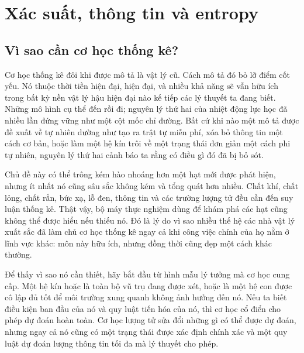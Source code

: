 \chapter{Xác suất, thông tin và entropy}


\section{Vì sao cần cơ học thống kê?}

Cơ học thống kê đôi khi được mô tả là vật lý cũ. Cách mô tả đó bỏ lỡ điểm cốt yếu. Nó thuộc thời tiền hiện đại, hiện đại, và nhiều khả năng sẽ vẫn hữu ích trong bất kỳ nền vật lý hậu hiện đại nào kế tiếp các lý thuyết ta đang biết. Những mô hình cụ thể đến rồi đi; nguyên lý thứ hai của nhiệt động lực học đã nhiều lần đứng vững như một cột mốc chỉ đường. Bất cứ khi nào một mô tả được đề xuất về tự nhiên dường như tạo ra trật tự miễn phí, xóa bỏ thông tin một cách cơ bản, hoặc làm một hệ kín trôi về một trạng thái đơn giản một cách phi tự nhiên, nguyên lý thứ hai cảnh báo ta rằng có điều gì đó đã bị bỏ sót.

Chủ đề này có thể trông kém hào nhoáng hơn một hạt mới được phát hiện, nhưng ít nhất nó cũng sâu sắc không kém và tổng quát hơn nhiều. Chất khí, chất lỏng, chất rắn, bức xạ, lỗ đen, thông tin và các trường lượng tử đều cần đến suy luận thống kê. Thật vậy, bộ máy thực nghiệm dùng để khám phá các hạt cũng không thể được hiểu nếu thiếu nó. Đó là lý do vì sao nhiều thế hệ các nhà vật lý xuất sắc đã làm chủ cơ học thống kê ngay cả khi công việc chính của họ nằm ở lĩnh vực khác: môn này hữu ích, nhưng đồng thời cũng đẹp một cách khác thường.

Để thấy vì sao nó cần thiết, hãy bắt đầu từ hình mẫu lý tưởng mà cơ học cung cấp. Một hệ kín hoặc là toàn bộ vũ trụ đang được xét, hoặc là một hệ con được cô lập đủ tốt để môi trường xung quanh không ảnh hưởng đến nó. Nếu ta biết điều kiện ban đầu của nó và quy luật tiến hóa của nó, thì cơ học cổ điển cho phép dự đoán hoàn toàn. Cơ học lượng tử sửa đổi những gì có thể được dự đoán, nhưng ngay cả nó cũng có một trạng thái được xác định chính xác và một quy luật dự đoán lượng thông tin tối đa mà lý thuyết cho phép.

